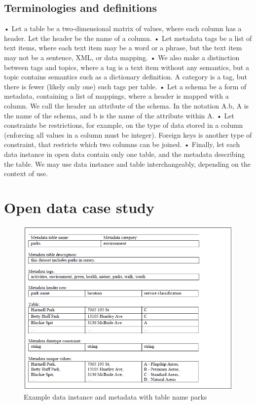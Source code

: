 \subsection{Terminologies and definitions}
• Let a table be a two-dimensional matrix of values, where each column has a header. Let the header be the name of a column.
• Let metadata tags be a list of text items, where each text item may be a word or a phrase, but the text item may not be a sentence, XML, or data mapping.
• We also make a distinction between tags and topics, where a tag is a text item without any semantics, but a topic contains semantics such as a dictionary definition. A category is a tag, but there is fewer (likely only one) such tags per table.
• Let a schema be a form of metadata, containing a list of mappings, where a header is mapped with a column. We call the header an attribute of the schema. In the notation A.b, A is the name of the schema, and b is the name of the attribute within A.
• Let constraints be restrictions, for example, on the type of data stored in a column (enforcing all values in a column must be integer). Foreign keys is another type of constraint, that restricts which two columns can be joined.
• Finally, let each data instance in open data contain only one table, and the metadata describing the table. We may use data instance and table interchangeably, depending on the context of use.

\section{Open data case study}
\label{sec:OpenDataCaseStudy}

\begin{figure}
    \centering
    \includegraphics[width=5in]{figures/example-parks.png}
    \caption{Example data instance and metadata with table name parks}
    \label{fig:example-parks}
\end{figure}

